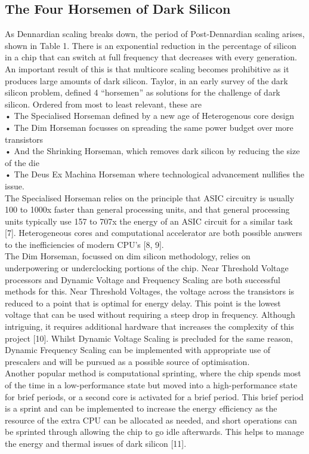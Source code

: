 		\subsection{The Four Horsemen of Dark Silicon}
			As Dennardian scaling breaks down, the period of Post-Dennardian scaling arises, shown in Table 1. There is an exponential reduction in the percentage of silicon in a chip that can switch at full frequency that decreases with every generation. An important result of this is that multicore scaling becomes prohibitive as it produces large amounts of dark silicon. Taylor, in an early survey of the dark silicon problem, defined 4 “horsemen” as solutions for the challenge of dark silicon. Ordered from most to least relevant, these are\\
			• The Specialised Horseman defined by a new age of Heterogenous core design\\
			• The Dim Horseman focusses on spreading the same power budget over more transistors\\
			• And the Shrinking Horseman, which removes dark silicon by reducing the size of the die\\
			• The Deus Ex Machina Horseman where technological advancement nullifies the issue. \\
			The Specialised Horseman relies on the principle that ASIC circuitry is usually 100 to 1000x faster than general processing units, and that general processing units typically use 157 to 707x the energy of an ASIC circuit for a similar task [7]. Heterogeneous cores and computational accelerator are both possible answers to the inefficiencies of modern CPU’s [8, 9].\\
			The Dim Horseman, focussed on dim silicon methodology, relies on underpowering or underclocking portions of the chip. Near Threshold Voltage processors and Dynamic Voltage and Frequency Scaling are both successful methods for this. Near Threshold Voltages, the voltage across the transistors is reduced to a point that is optimal for energy delay. This point is the lowest voltage that can be used without requiring a steep drop in frequency. Although intriguing, it requires additional hardware that increases the complexity of this project [10]. Whilst Dynamic Voltage Scaling is precluded for the same reason, Dynamic Frequency Scaling can be implemented with appropriate use of prescalers and will be pursued as a possible source of optimisation. \\
			Another popular method is computational sprinting, where the chip spends most of the time in a low-performance state but moved into a high-performance state for brief periods, or a second core is activated for a brief period. This brief period is a sprint and can be implemented to increase the energy efficiency as the resource of the extra CPU can be allocated as needed, and short operations can be sprinted through allowing the chip to go idle afterwards. This helps to manage the energy and thermal issues of dark silicon [11].
